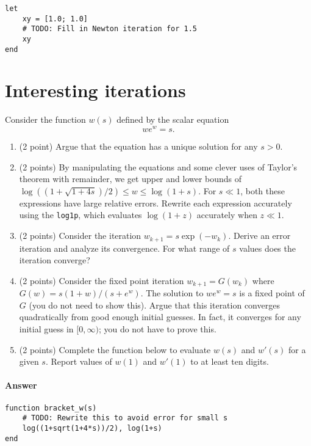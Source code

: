 \documentclass[12pt, leqno]{article} %
\providecommand{\tightlist}{%
  \setlength{\itemsep}{0pt}\setlength{\parskip}{0pt}}
\begin{document}
\begin{verbatim}
let
    xy = [1.0; 1.0]
    # TODO: Fill in Newton iteration for 1.5
    xy
end
\end{verbatim}

\section{Interesting iterations}

Consider the function \(w(s)\) defined by the scalar equation
\[we^w = s.\]

\begin{enumerate}
\def\labelenumi{\arabic{enumi}.}
\tightlist
\item
  (2 point) Argue that the equation has a unique solution for any
  \(s > 0\).
\item
  (2 points) By manipulating the equations and some clever uses of
  Taylor's theorem with remainder, we get upper and lower bounds of
  \(\log((1+\sqrt{1+4s})/2) \leq w \leq \log(1+s)\). For \(s \ll 1\),
  both these expressions have large relative errors. Rewrite each
  expression accurately using the \texttt{log1p}, which evaluates
  \(\log(1+z)\) accurately when \(z \ll 1\).
\item
  (2 points) Consider the iteration \(w_{k+1} = s \exp(-w_k)\). Derive
  an error iteration and analyze its convergence. For what range of
  \(s\) values does the iteration converge?
\item
  (2 points) Consider the fixed point iteration \(w_{k+1} = G(w_k)\)
  where \(G(w) = s(1+w)/(s+e^w)\). The solution to \(we^w = s\) is a
  fixed point of \(G\) (you do not need to show this). Argue that this
  iteration converges quadratically from good enough initial guesses. In
  fact, it converges for any initial guess in \([0,\infty)\); you do not
  have to prove this.
\item
  (2 points) Complete the function below to evaluate \(w(s)\) and
  \(w'(s)\) for a given \(s\). Report values of \(w(1)\) and \(w'(1)\)
  to at least ten digits.
\end{enumerate}

\paragraph{Answer}

\begin{verbatim}
function bracket_w(s)
    # TODO: Rewrite this to avoid error for small s
    log((1+sqrt(1+4*s))/2), log(1+s)
end
\end{verbatim}
\end{document}
